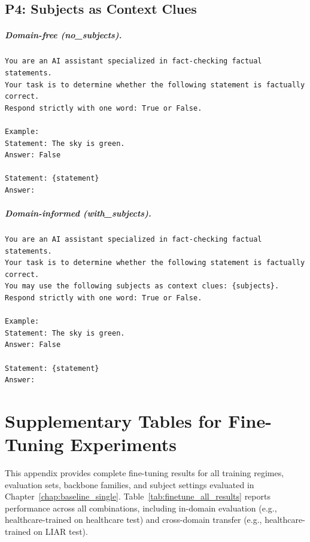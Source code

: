 \section{P4: Subjects as Context Clues}
\paragraph{Domain-free (no\_subjects).}
\begin{verbatim}
You are an AI assistant specialized in fact-checking factual statements.
Your task is to determine whether the following statement is factually correct.
Respond strictly with one word: True or False.

Example:
Statement: The sky is green.
Answer: False

Statement: {statement}
Answer:
\end{verbatim}

\paragraph{Domain-informed (with\_subjects).}
\begin{verbatim}
You are an AI assistant specialized in fact-checking factual statements.
Your task is to determine whether the following statement is factually correct.
You may use the following subjects as context clues: {subjects}.
Respond strictly with one word: True or False.

Example:
Statement: The sky is green.
Answer: False

Statement: {statement}
Answer:
\end{verbatim}

\chapter{Supplementary Tables for Fine-Tuning Experiments}

This appendix provides complete fine-tuning results for all training regimes, evaluation sets, backbone families, and subject settings evaluated in Chapter~\ref{chap:baseline_single}. Table~\ref{tab:finetune_all_results} reports performance across all combinations, including in-domain evaluation (e.g., healthcare-trained on healthcare test) and cross-domain transfer (e.g., healthcare-trained on LIAR test).

